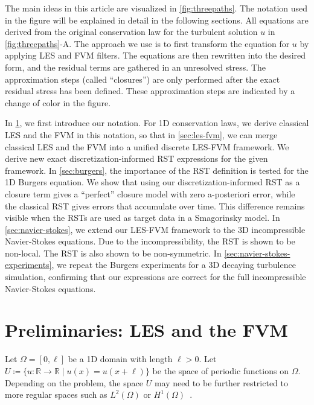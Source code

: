 \documentclass[preprint,twocolumn,5p]{elsarticle}
\begin{document}
The main ideas in this article are visualized in \cref{fig:threepaths}.
The notation used in the figure will be explained in detail in the following sections.
All equations are derived from the original conservation law for the
turbulent solution $u$ in \cref{fig:threepaths}-A.
The approach we use is to first transform the equation for $u$ by applying LES
and FVM filters.
The equations are then rewritten into the desired form, and the residual terms 
are gathered in an unresolved stress.
The approximation steps (called ``closures'')
are only performed after the exact residual stress has been defined.
These approximation steps are indicated by a change of color in the figure.


In \cref{sec:conservation-law},
we first introduce our notation.
For 1D conservation laws, we derive classical LES and the
FVM in this notation, so that in \cref{sec:les-fvm}, we can merge classical LES
and the FVM into a unified discrete LES-FVM framework. We derive new exact
discretization-informed RST expressions for the given framework.
In \cref{sec:burgers},
the importance of the RST definition is tested for the 1D
Burgers equation. We show that using our discretization-informed RST as
a closure term gives a ``perfect'' closure model with zero a-posteriori error,
while the classical RST gives errors that accumulate over time. This difference
remains visible when the RSTs are used as target data in a Smagorinsky model.
In \cref{sec:navier-stokes}, we extend our LES-FVM framework to the 3D
incompressible Navier-Stokes equations.
Due to the incompressibility, the RST is shown to be non-local.
The RST is also shown to be non-symmetric.
In \cref{sec:navier-stokes-experiments}, we repeat the Burgers experiments for a
3D decaying turbulence simulation, confirming that our expressions are correct
for the full incompressible Navier-Stokes equations.

\section{Preliminaries: LES and the FVM} \label{sec:conservation-law}

Let $\Omega = [0, \ell]$ be a 1D domain with length $\ell > 0$.
Let $U \coloneq \{ u : \mathbb{R} \to \mathbb{R} \mid u(x) = u(x + \ell) \}$
be the space of periodic functions on $\Omega$.
Depending on the problem,
the space $U$ may need to be further restricted
to more regular spaces such as
$L^2(\Omega)$ or $H^1(\Omega)$~\cite{berselliMathematicsLargeEddy2006}.
\end{document}
